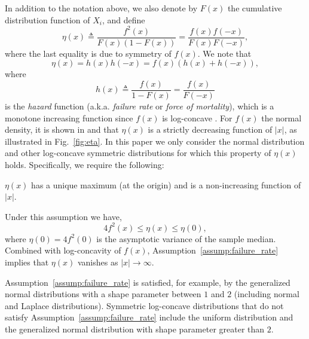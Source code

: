 In addition to the notation above, we also denote by $F(x)$ the cumulative distribution function of $X_i$, and define
\begin{equation} \label{eq:eta_def}
\eta(x) \triangleq \frac{f^2(x)}{F(x)(1-F(x))} =  \frac{f(x)f(-x)}{F(x)F(-x)}, 
\end{equation}
where the last equality is due to symmetry of $f(x)$. We note that 
\begin{equation}
\label{eq:eta_h}
\eta(x) = h(x)h(-x) = f(x) \left( h(x) + h(-x) \right), 
\end{equation}
where 
\begin{equation*}
h(x) \triangleq \frac{f(x)}{1-F(x)} = \frac{f(x)}{F(-x)}
\end{equation*}
is the \emph{hazard} function (a.k.a. \emph{failure rate} or \emph{force of mortality}), which is a monotone increasing function since $f(x)$ is log-concave \cite{bagnoli2005log}. 
%
For $f(x)$ the normal density, it is shown in \cite{Samford1953} and \cite{hammersley1950estimating} that $\eta(x)$ is a strictly decreasing function of $|x|$, as illustrated in Fig.~\ref{fig:eta}. 
%
In this paper we only consider the normal distribution and other log-concave symmetric distributions for which this property of $\eta(x)$ holds. Specifically, we require the following:
\begin{assump} \label{assump:failure_rate}
 $\eta(x)$ has a unique maximum (at the origin) and is a non-increasing function of $|x|$. 
\end{assump}
Under this assumption we have, 
\begin{equation*}
4f^2(x) \leq \eta(x) \leq \eta(0),
\end{equation*} 
%
where $\eta(0) = 4 f^2(0)$ is the asymptotic variance of the sample median. Combined with log-concavity of $f(x)$, Assumption~\ref{assump:failure_rate} implies that $\eta(x)$ vanishes as $|x|\rightarrow \infty$. \par
%
Assumption~\ref{assump:failure_rate} is satisfied, for example, by the generalized normal distributions with a shape parameter between $1$ and $2$ (including normal and Laplace distributions). Symmetric log-concave distributions that do not satisfy Assumption~\ref{assump:failure_rate} include the uniform distribution and the generalized normal distribution with shape parameter greater than $2$.\par

